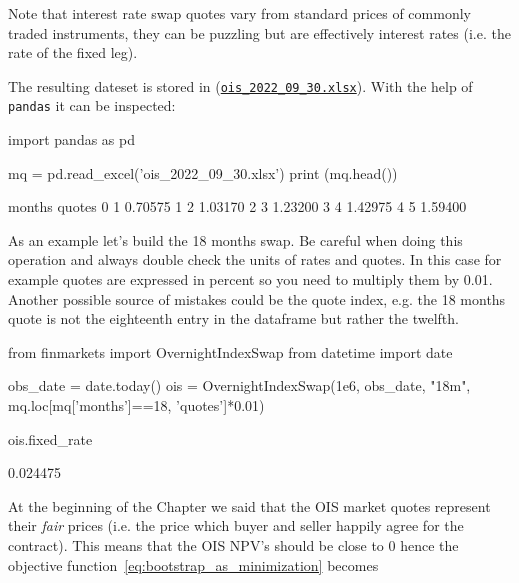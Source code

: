 Note that interest rate swap quotes vary from standard prices of commonly traded instruments, they can be puzzling but are effectively interest rates (i.e. the rate of the fixed leg).

The resulting dateset is stored in (\href{https://github.com/matteosan1/finance_course/raw/master/input_files/ois_2022_09_30.xlsx}{\texttt{ois\_2022\_09\_30.xlsx}}). With the help of \texttt{pandas} it can be inspected:

\begin{ipython}
import pandas as pd

mq = pd.read_excel('ois_2022_09_30.xlsx')
print (mq.head())
\end{ipython}
\begin{ioutput}
   months   quotes
0       1  0.70575
1       2  1.03170
2       3  1.23200
3       4  1.42975
4       5  1.59400
\end{ioutput}

As an example let's build the 18 months swap. Be careful when doing this operation and always double check the units of rates and quotes. In this case for example quotes are expressed in percent so you need to multiply them by 0.01. Another possible source of mistakes could be the quote index, e.g. the 18 months quote is not the eighteenth entry in the dataframe but rather the twelfth.

\begin{ipython}
from finmarkets import OvernightIndexSwap
from datetime import date

obs_date = date.today()
ois = OvernightIndexSwap(1e6, obs_date, "18m",
                         mq.loc[mq['months']==18, 'quotes']*0.01)
	
ois.fixed_rate
\end{ipython}
\begin{ioutput}
0.024475
\end{ioutput}

At the beginning of the Chapter we said that the OIS market quotes represent their \emph{fair} prices (i.e. the price which buyer and seller happily agree for the contract). This means that the OIS NPV's should be close to 0 hence the objective function~\ref{eq:bootstrap_as_minimization} becomes

